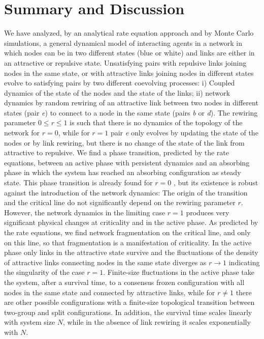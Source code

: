 \documentclass[aps,pre,notitlepage]{revtex4-1}
\begin{document}
\section*{Summary and Discussion}

We have analyzed, by an analytical rate equation approach and by Monte Carlo simulations, a general dynamical model of interacting agents in a network in which nodes can be in two different states (blue or white) and links are either in an attractive or repulsive state. Unsatisfying pairs with repulsive links joining nodes in the same state, or with attractive links joining nodes in different states evolve to satisfying pairs by two different coevolving processes: i) Coupled dynamics of the state of the nodes and the state of the links; ii) network dynamics by random rewiring of an attractive link between two nodes in different states (pair \textit{e}) to connect to a node in the same state (pairs \textit{b} or \textit{d}). The rewiring parameter $0\leq r \leq1$ is such that there is no dynamics of the topology of the network for $r=0$, while for $r=1$ pair \textit{e} only evolves by updating the state of the nodes or by link rewiring, but there is no change of the state of the link from attractive to repulsive. We find a phase transition, predicted by the rate equations, between an active phase with persistent dynamics and an absorbing phase in which the system has reached an absorbing configuration as steady state. This phase transition is already found for $r=0$ \cite{saeedian2019absorbing}, but its existence is robust against the introduction of the network dynamics: The origin of the transition and the critical line do not significantly depend on the rewiring parameter $r$. However, the network dynamics in the limiting case $r=1$ produces very significant physical changes at criticality and in the active phase. As predicted by the rate equations, we find network fragmentation on the critical line, and only on this line, so that fragmentation is a manifestation of criticality. In the active phase only links in the attractive state survive and the fluctuations of the density of attractive links connecting nodes in the same state diverges as $r\longrightarrow 1$ indicating the singularity of the case $r=1$. Finite-size fluctuations in the active phase take the system, after a survival time, to a consensus frozen configuration with all nodes in the same state and connected by attractive links, while for $r\neq 1$ there are other possible configurations with a finite-size topological transition between two-group and split configurations. In addition, the survival time scales linearly with system size $N$, while in the absence of link rewiring it scales exponentially with $N$.
\end{document}
